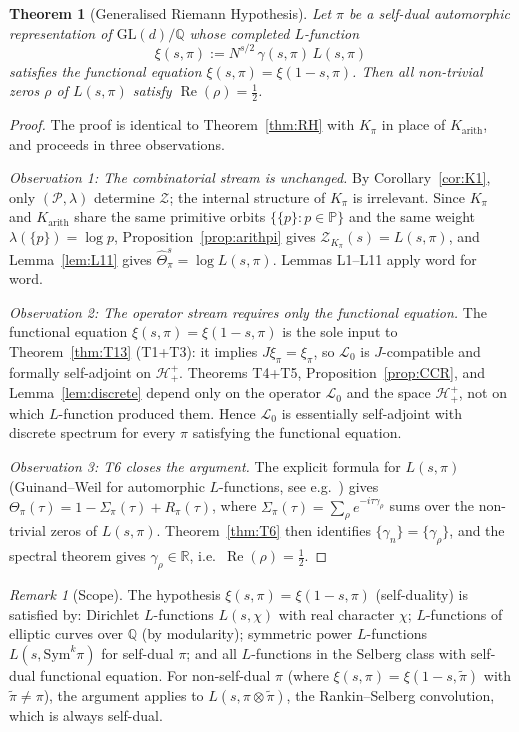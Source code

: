 \documentclass[12pt,a4paper]{article}
\newtheorem{theorem}{Theorem}[section]
\theoremstyle{remark}
\newtheorem*{remark}{Remark}
\begin{document}
\begin{theorem}[Generalised Riemann Hypothesis]\label{thm:GRH}
Let $\pi$ be a self-dual automorphic representation of
$\mathrm{GL}(d)/\mathbb{Q}$ whose completed $L$-function
\[
  \xi(s,\pi) := N^{s/2}\,\gamma(s,\pi)\,L(s,\pi)
\]
satisfies the functional equation $\xi(s,\pi)=\xi(1-s,\pi)$.
Then all non-trivial zeros $\rho$ of $L(s,\pi)$ satisfy
$\operatorname{Re}(\rho)=\tfrac{1}{2}$.
\end{theorem}
\begin{proof}
The proof is identical to Theorem~\ref{thm:RH} with $K_\pi$ in place
of $K_{\mathrm{arith}}$, and proceeds in three observations.

\emph{Observation 1: The combinatorial stream is unchanged.}
By Corollary~\ref{cor:K1}, only $(\mathcal{P},\lambda)$ determine
$\mathcal{Z}$; the internal structure of $K_\pi$ is irrelevant.
Since $K_\pi$ and $K_{\mathrm{arith}}$ share the same primitive orbits
$\{\{p\}:p\in\mathbb{P}\}$ and the same weight $\lambda(\{p\})=\log p$,
Proposition~\ref{prop:arithpi} gives
$\mathcal{Z}_{K_\pi}(s)=L(s,\pi)$,
and Lemma~\ref{lem:L11} gives $\hat\Theta_\pi^s=\log L(s,\pi)$.
Lemmas L1--L11 apply word for word.

\emph{Observation 2: The operator stream requires only the functional equation.}
The functional equation $\xi(s,\pi)=\xi(1-s,\pi)$ is the sole input
to Theorem~\ref{thm:T13} (T1+T3): it implies $J\xi_\pi=\xi_\pi$,
so $\mathcal{L}_0$ is $J$-compatible and formally self-adjoint on
$\mathcal{H}^+_+$.
Theorems T4+T5, Proposition~\ref{prop:CCR}, and
Lemma~\ref{lem:discrete} depend only on the operator $\mathcal{L}_0$
and the space $\mathcal{H}^+_+$, not on which $L$-function produced them.
Hence $\mathcal{L}_0$ is essentially self-adjoint with discrete spectrum
for every $\pi$ satisfying the functional equation.

\emph{Observation 3: T6 closes the argument.}
The explicit formula for $L(s,\pi)$ (Guinand--Weil for automorphic
$L$-functions, see e.g.\ \cite{Connes1999}) gives
$\Theta_\pi(\tau)=1-\Sigma_\pi(\tau)+R_\pi(\tau)$,
where $\Sigma_\pi(\tau)=\sum_\rho e^{-i\tau\gamma_\rho}$ sums over the
non-trivial zeros of $L(s,\pi)$.
Theorem~\ref{thm:T6} then identifies $\{\gamma_n\}=\{\gamma_\rho\}$,
and the spectral theorem gives $\gamma_\rho\in\mathbb{R}$,
i.e.\ $\operatorname{Re}(\rho)=\tfrac{1}{2}$.
\end{proof}

\begin{remark}[Scope]
The hypothesis $\xi(s,\pi)=\xi(1-s,\pi)$ (self-duality) is satisfied
by: Dirichlet $L$-functions $L(s,\chi)$ with real character $\chi$;
$L$-functions of elliptic curves over $\mathbb{Q}$ (by modularity);
symmetric power $L$-functions $L(s,\mathrm{Sym}^k\pi)$ for
self-dual $\pi$; and all $L$-functions in the Selberg class with
self-dual functional equation.
For non-self-dual $\pi$ (where $\xi(s,\pi)=\xi(1-s,\tilde\pi)$ with
$\tilde\pi\neq\pi$), the argument applies to $L(s,\pi\otimes\tilde\pi)$,
the Rankin--Selberg convolution, which is always self-dual.
\end{remark}
\end{document}
